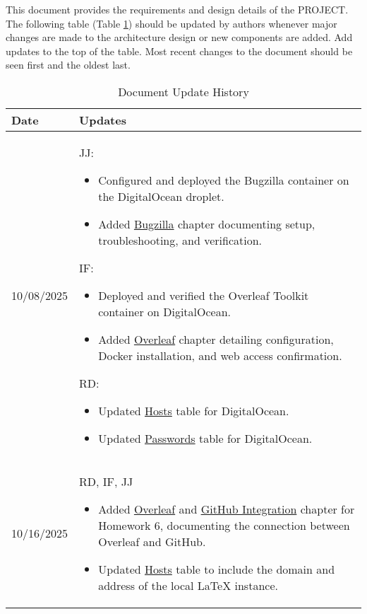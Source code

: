 This document provides the requirements and design details of the
PROJECT.  The following table (Table \ref{Table::UpdateHistory}) should be
updated by authors whenever major changes are made to the architecture
design or new components are added. Add updates to the top of the table.  
Most recent changes to the document should be seen first and the oldest 
last.

\begin{longtable}{|l||p{13.5cm}|}
\caption{Document Update History \label{Table::UpdateHistory}}\\
\hline
\textbf{Date} & \textbf{Updates} \\
\hline 
\endhead



10/08/2025 & 
{JJ:}
\begin{itemize}[topsep=0pt,itemsep=0pt,parsep=0pt,partopsep=0pt,leftmargin=12pt]
  \item Configured and deployed the Bugzilla container on the DigitalOcean droplet.
  \item Added \hyperref[Chapter::Bugzilla]{Bugzilla} chapter documenting setup, troubleshooting, and verification.
\end{itemize}

{IF:}
\begin{itemize}[topsep=0pt,itemsep=0pt,parsep=0pt,partopsep=0pt,leftmargin=12pt]
  \item Deployed and verified the Overleaf Toolkit container on DigitalOcean.
  \item Added \hyperref[Chapter::Overleaf]{Overleaf} chapter detailing configuration, Docker installation, and web access confirmation.
\end{itemize}

{RD:}
\begin{itemize}[topsep=0pt,itemsep=0pt,parsep=0pt,partopsep=0pt,leftmargin=12pt]
  \item Updated \hyperref[Chapter::Hosts]{Hosts} table for DigitalOcean.
  \item Updated \hyperref[Chapter::Passwords]{Passwords} table for DigitalOcean.

\end{itemize}
\\ \hline

10/16/2025 & RD, IF, JJ
\begin{itemize}[topsep=0pt,itemsep=0pt,parsep=0pt,partopsep=0pt,leftmargin=12pt]
    \item Added \hyperref[Chapter::Overleaf]{Overleaf} and \hyperref[Chapter::Github Integration]{GitHub Integration} chapter for Homework 6, documenting the connection between Overleaf and GitHub.
    \item Updated \hyperref[Chapter::Hosts]{Hosts} table to include the domain and address of the local LaTeX instance.
\end{itemize}
\\ \hline


\end{longtable}
